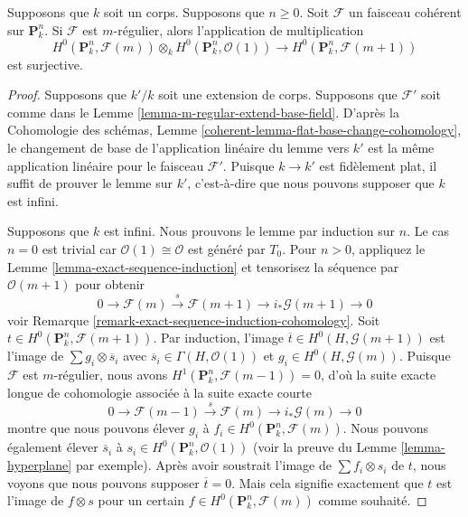 \begin{lemma}
\label{lemma-m-regular-multiply}
Supposons que $k$ soit un corps. Supposons que $n \geq 0$. Soit
$\mathcal{F}$ un faisceau cohérent sur $\mathbf{P}^n_k$. Si
$\mathcal{F}$ est $m$-régulier, alors l'application de multiplication
$$
H^0(\mathbf{P}^n_k, \mathcal{F}(m)) \otimes_k
H^0(\mathbf{P}^n_k, \mathcal{O}(1))
\longrightarrow
H^0(\mathbf{P}^n_k, \mathcal{F}(m + 1))
$$
est surjective.
\end{lemma}

\begin{proof}
Supposons que $k'/k$ soit une extension de corps. Supposons que
$\mathcal{F}'$ soit comme dans le Lemme
\ref{lemma-m-regular-extend-base-field}. D'après la Cohomologie des schémas,
Lemme \ref{coherent-lemma-flat-base-change-cohomology}, le changement de base de
l'application linéaire du lemme vers $k'$ est la même application linéaire pour le
faisceau $\mathcal{F}'$. Puisque $k \to k'$ est fidèlement plat, il suffit de
prouver le lemme sur $k'$, c’est-à-dire que nous pouvons supposer que $k$ est infini.

\medskip\noindent
Supposons que $k$ est infini. Nous prouvons le lemme par
induction sur $n$. Le cas $n = 0$ est trivial car
$\mathcal{O}(1) \cong \mathcal{O}$ est généré par $T_0$. Pour
$n > 0$, appliquez le Lemme \ref{lemma-exact-sequence-induction}
et tensorisez la séquence par $\mathcal{O}(m + 1)$ pour obtenir
$$
0 \to \mathcal{F}(m) \xrightarrow{s} \mathcal{F}(m + 1) \to
i_*\mathcal{G}(m + 1) \to 0
$$
voir Remarque
\ref{remark-exact-sequence-induction-cohomology}. Soit $t \in
H^0(\mathbf{P}^n_k, \mathcal{F}(m + 1))$. Par induction, l'image
$\overline{t} \in H^0(H, \mathcal{G}(m + 1))$ est l'image de $\sum g_i
\otimes \overline{s}_i$ avec $\overline{s}_i \in \Gamma(H,
\mathcal{O}(1))$ et $g_i \in H^0(H, \mathcal{G}(m))$. Puisque $\mathcal{F}$
est $m$-régulier, nous avons $H^1(\mathbf{P}^n_k, \mathcal{F}(m - 1)) = 0$,
d'où la suite exacte longue de cohomologie associée à la suite exacte courte
$$
0 \to \mathcal{F}(m - 1) \xrightarrow{s} \mathcal{F}(m) \to
i_*\mathcal{G}(m) \to 0
$$
montre que nous pouvons élever $g_i$ à $f_i \in
H^0(\mathbf{P}^n_k, \mathcal{F}(m))$. Nous pouvons également
élever $\overline{s}_i$ à $s_i \in H^0(\mathbf{P}^n_k,
\mathcal{O}(1))$ (voir la preuve du Lemme \ref{lemma-hyperplane} par
exemple). Après avoir soustrait l'image de $\sum f_i \otimes s_i$ de
$t$, nous voyons que nous pouvons supposer $\overline{t} = 0$. Mais
cela signifie exactement que $t$ est l'image de $f \otimes s$ pour un
certain $f \in H^0(\mathbf{P}^n_k, \mathcal{F}(m))$ comme souhaité.
\end{proof}


